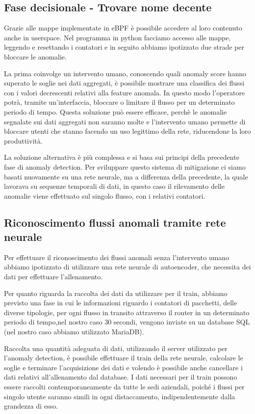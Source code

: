 \subsection{Fase decisionale - Trovare nome decente}

Grazie alle mappe implementate in eBPF è possibile accedere al loro contenuto anche in userspace. Nel programma in python facciamo accesso alle mappe, leggendo e resettando i contatori e in seguito abbiamo ipotizzato due strade per bloccare le anomalie.

La prima coinvolge un intervento umano, conoscendo quali anomaly score hanno superato le soglie nei dati aggregati, è possibile mostrare una classifica dei flussi con i valori decrescenti relativi alla feature anomala. In questo modo l'operatore potrà, tramite un'interfaccia, bloccare o limitare il flusso per un determinato periodo di tempo. Questa soluzione può essere efficace, perchè le anomalie segnalate sui dati aggregati non saranno molte e l'intervento umano permette di bloccare utenti che stanno facendo un uso legittimo della rete, riducendone la loro produttività.

La soluzione alternativa è più complessa e si basa sui principi della precedente fase di anomaly detection.
Per sviluppare questo sistema di mitigazione ci siamo basati nuovamente su una rete neurale, ma a differenza della precedente, la quale lavorava su sequenze temporali di dati, in questo caso il rilevamento delle anomalie viene effettuato sul singolo flusso, con i relativi contatori.

\subsection{Riconoscimento flussi anomali tramite rete neurale}

Per effettuare il riconoscimento dei flussi anomali senza l'intervento umano abbiamo ipotizzato di utilizzare una rete neurale di autoencoder, che necessita dei dati per effettuare l'allenamento.

Per quanto riguarda la raccolta dei dati da utilizzare per il train, abbiamo previsto una fase in cui le informazioni riguardo i contatori di pacchetti, delle diverse tipologie, per ogni flusso in transito attraverso il router in un determinato periodo di tempo,nel nostro caso 30 secondi, vengono inviate su un database SQL (nel nostro caso abbiamo utilizzato MariaDB).

Raccolta una quantità adeguata di dati, utilizzando il server utilizzato per l'anomaly detection, è possibile effettuare il train della rete neurale, calcolare le soglie e terminare l'acquisizione dei dati e volendo è possibile anche cancellare i dati relativi all'allenamento dal database. I dati necessari per il train possono essere raccolti contemporaneamente da tutte le sedi aziendali, poiché i flussi per singolo utente saranno simili in ogni distaccamento, indipendentemente dalla grandezza di esso.

